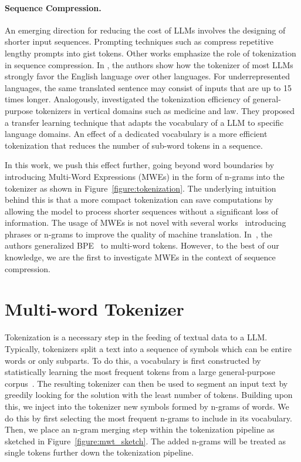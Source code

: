 \documentclass[11pt]{article}
\newcommand{\az}[1]{\color{black} #1}
\begin{document}
{\az 
\paragraph{Sequence Compression.}
An emerging direction for reducing the cost of LLMs involves the designing of shorter input sequences. Prompting techniques such as \citet{mu2023learning} compress repetitive lengthy prompts into gist tokens. Other works emphasize the role of tokenization in sequence compression. In \citet{petrov2023language}, the authors show how the tokenizer of most LLMs strongly favor the English language over other languages. For underrepresented languages, the same translated sentence may consist of inputs that are up to 15 times longer. Analogously, \citet{FVT} investigated the tokenization efficiency of general-purpose tokenizers in vertical domains such as medicine and law. They proposed a transfer learning technique that adapts the vocabulary of a LLM to specific language domains. An effect of a dedicated vocabulary is a more efficient tokenization that reduces the number of sub-word tokens in a sequence.
}

In this work, we push this effect further, going beyond word boundaries by introducing Multi-Word Expressions (MWEs) in the form of n-grams into the tokenizer as shown in Figure~\ref{figure:tokenization}. The underlying intuition behind this is that a more compact tokenization can save computations by allowing the model to process shorter sequences without a significant loss of information. The usage of MWEs is not novel with several works~\citep{Phrase, MWE, MBPE} introducing phrases or n-grams to improve the quality of machine translation. In~\citet{MBPE}, the authors generalized BPE~\citep{BPE} to multi-word tokens. However, to the best of our knowledge, we are the first to investigate MWEs in the context of sequence compression.



\section{Multi-word Tokenizer}\label{section:methodology}
Tokenization is a necessary step in the feeding of textual data to a LLM. Typically, tokenizers split a text into a sequence of symbols which can be entire words or only subparts. To do this, a vocabulary is first constructed by statistically learning the most frequent tokens from a large general-purpose corpus~\citep{BPE, WordPiece, SentencePiece}. The resulting tokenizer can then be used to segment an input text by greedily looking for the solution with the least number of tokens. 
Building upon this, we inject into the tokenizer new symbols formed by n-grams of words. We do this by first selecting the most frequent n-grams to include in its vocabulary. Then, we place an n-gram merging step within the tokenization pipeline as sketched in Figure~\ref{figure:mwt_sketch}. The added n-grams will be treated as single tokens further down the tokenization pipeline.
\end{document}
